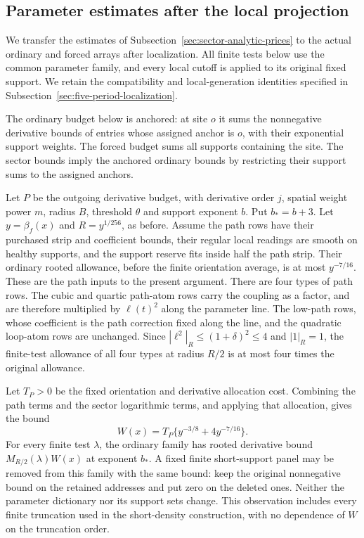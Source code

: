 \subsection{Parameter estimates after the local projection}
\label{sec:projected-parameter-prices}
We transfer the estimates of Subsection~\ref{sec:sector-analytic-prices}
to the actual ordinary and forced arrays after localization. All
finite tests below use the common parameter family, and every local
cutoff is applied to its original fixed support. We retain the
compatibility and local-generation identities specified in
Subsection~\ref{sec:five-period-localization}.

The ordinary budget below is anchored: at site $o$ it sums the
nonnegative derivative bounds of entries whose assigned anchor is $o$,
with their exponential support weights. The forced budget sums all
supports containing the site. The sector bounds imply the anchored
ordinary bounds by restricting their support sums to the assigned anchors.

Let $P$ be the outgoing derivative budget, with derivative order
$j$, spatial weight power $m$, radius $B$, threshold $\theta$ and
support exponent $b$. Put $b_*=b+3$. Let
$y=\beta_f(x)$ and $R=y^{1/256}$, as before. Assume the path
rows have their purchased strip and coefficient bounds, their
regular local readings are smooth on healthy supports, and the
support reserve fits inside half the path strip. Their ordinary
rooted allowance, before the finite orientation average, is at
most $y^{-7/16}$. These are the path inputs to the present
argument. There are four types of path rows. The cubic and quartic
path-atom rows carry the coupling as a factor, and are therefore
multiplied by $\ell(t)^2$ along the parameter line. The low-path
rows, whose coefficient is the path correction fixed along the line,
and the quadratic loop-atom rows are unchanged. Since
$|\ell^2|_R\le(1+\delta)^2\le4$ and $|1|_R=1$, the finite-test
allowance of all four types at radius $R/2$ is at most four times
the original allowance.

Let $T_P>0$ be the fixed orientation and derivative allocation
cost. Combining the path terms and the sector logarithmic terms,
and applying that allocation, gives the bound
\begin{equation}\label{eq:projected-initial-price}
                    W(x)=T_P\{y^{-3/8}+4y^{-7/16}\}.
\end{equation}
For every finite test $\lambda$, the ordinary family has rooted
derivative bound $M_{R/2}(\lambda)W(x)$ at exponent $b_*$.
A fixed finite short-support panel may be removed from this
family with the same bound: keep the original nonnegative bound
on the retained addresses and put zero on the deleted ones.
Neither the parameter dictionary nor its support sets change.
This observation includes every finite truncation used in the
short-density construction, with no dependence of $W$ on the
truncation order.

